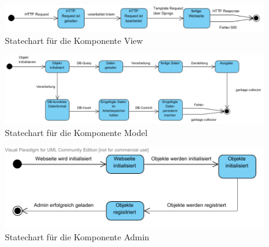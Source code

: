 \begin{figure}
\includegraphics[width=0.8\linewidth]{bilder/KompView.pdf}
\caption{Statechart für die Komponente View}
\label{StView}
\end{figure}

\begin{figure}
\includegraphics[width=0.8\linewidth]{bilder/KompModel.pdf}
\caption{Statechart für die Komponente Model}
\label{StModel}
\end{figure}

\begin{figure}
\includegraphics[width=0.8\linewidth]{bilder/KompAdmin.pdf}
\caption{Statechart für die Komponente Admin}
\label{StAdmin}
\end{figure}










